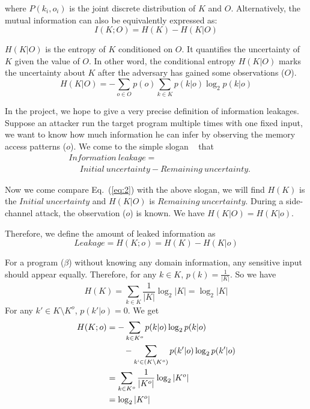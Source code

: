 where $P(k_i, o_i)$ is the joint discrete distribution of $K$ and $O$.
Alternatively, the mutual information can also be equivalently expressed as:
\begin{equation} \label{eq:2}
    I(K;O) = H(K) - H(K|O)
\end{equation}

$H(K|O)$ is the entropy of $K$ conditioned on $O$. It quantifies the uncertainty of $K$
given the value of $O$. In other word, the conditional entropy $H(K|O)$ marks the 
uncertainty about $K$ after the adversary has gained some observations ($O$). 
\begin{equation}
    H(K|O) = - \sum_{o {\in} O} {p(o) \sum_{k {\in} K}{p(k|o)\log_2p(k|o)}}
\end{equation}

In the project, we hope to give a very precise definition of information leakages. 
Suppose an attacker run the target program multiple times with one fixed input, we
want to know how much information he can infer by observing the memory access patterns ($o$).
We come to the simple slogan ~\cite{10.1007/978-3-642-00596-1_21} %
that
\begin{align*}
 & \mathit{Information\ leakage} = \\
 & ~~~~~~ \mathit{Initial\ uncertainty} - \mathit{Remaining\ uncertainty}. 
\end{align*}

Now we come compare Eq.~(\ref{eq:2}) with the above slogan, we will
find $H(K)$ is the $\mathit{Initial\ uncertainty}$ and $H(K|O)$ is
$\mathit{Remaining\ uncertainty}$. During a side-channel attack, 
the observation ($o$) is known.  We have $H(K|O) = H(K|o)$.

Therefore, we define the amount of leaked information as 
\begin{displaymath}
    Leakage = H(K;o) = H(K) - H(K|o)
\end{displaymath}

For a program ($\beta$) without knowing any domain information, any sensitive
input should appear equally. Therefore, for any $k \in K$, $p(k) = \frac{1}{|K|}$.
So we have 
$$H(K) = \sum_{k {\in} K}\frac{1}{|K|}\log_2{|K|} = \log_2{|K|}$$
For any $k' \in K \setminus K^o$, $p(k'|o) = 0$. We get
\begin{align*}
H(K;o) &= - \sum_{k {\in} K^o}{p(k|o)\log_2p(k|o)} \\
       & \qquad   - \sum_{k` {\in} (K \setminus K^o)}{p(k'|o)\log_2p(k'|o)}\\
       &= \sum_{k {\in} K^o}\frac{1}{|K^o|}\log_2{|K^o|}\\
       &= \log_2{|K^o|}
\end{align*}


